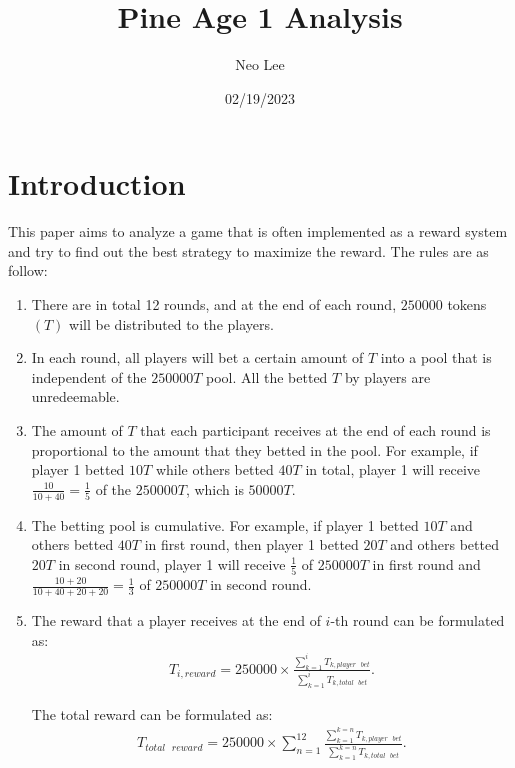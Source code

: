 \documentclass{article}
\title{Pine Age 1 Analysis}
\author{Neo Lee}
\date{02/19/2023}
\begin{document}
 

\maketitle 

\section*{Introduction}
This paper aims to analyze a game that is often implemented as a reward system and try to find out the best strategy to maximize the reward.
The rules are as follow:

\begin{enumerate}
    \item 
    There are in total 12 rounds, and at the end of each round, $\num{250000}$ tokens $(T)$ will be distributed to the players.

    \item
    In each round, all players will bet a certain amount of $T$ into a pool that is independent of the $\num{250000}T$ pool. 
    All the betted $T$ by players are unredeemable. 

    \item
    The amount of $T$ that each participant receives at the end of each round is proportional to the amount that they betted in the pool. 
    For example, if player 1 betted $10T$ while others betted $40T$ in total, player 1 will receive $\frac{10}{10+40}=\frac{1}{5}$ of the $\num{250000}T$, which is $\num{50000}T$.

    \item 
    The betting pool is cumulative. For example, if player 1 betted $10T$ and others betted $40T$ in first round, then player 1 betted $20T$ and others betted $20T$ in second round, player 1 will receive $\frac{1}{5}$ of $\num{250000}T$ in first round and $\frac{10+20}{10+40+20+20}=\frac{1}{3}$ of $\num{250000}T$ in second round.

    \item
    The reward that a player receives at the end of $i$-th round can be formulated as:
    \begin{align}
        T_{i,reward} = \num{250000}\times \frac{\sum_{k=1}^{i}T_{k,player \text{ }bet}}{\sum_{k=1}^{i}T_{k,total \text{ }bet}}.
    \end{align}

    The total reward can be formulated as:
    \begin{align}
        T_{total \text{ }reward} = \num{250000}\times \sum_{n=1}^{12}\frac{\sum_{k=1}^{k=n}T_{k,player \text{ }bet}}{\sum_{k=1}^{k=n}T_{k,total \text{ }bet}}.
    \end{align}
\end{enumerate}
\end{document}
